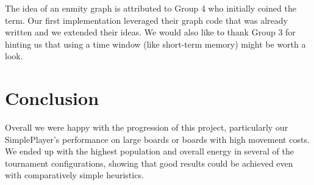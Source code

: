 \documentclass[
10pt, %
letterpaper, %
oneside, %
headinclude,footinclude, %
english
]{article}
\begin{document}
The idea of an enmity graph is attributed to Group 4 who initially coined the term. Our first implementation leveraged their graph code that was already written and we extended their ideas. We would also like to thank Group 3 for hinting us that using a time window (like short-term memory) might be worth a look.

\section{Conclusion}

Overall we were happy with the progression of this project, particularly our SimplePlayer's performance on large boards or boards with high movement costs. We ended up with the highest population and overall energy in several of the tournament configurations, showing that good results could be achieved even with comparatively simple heuristics.
\end{document}
